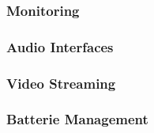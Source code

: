 \subsubsection{Monitoring}
%

\subsubsection{Audio Interfaces}

\subsubsection{Video Streaming}

\subsubsection{Batterie Management}
